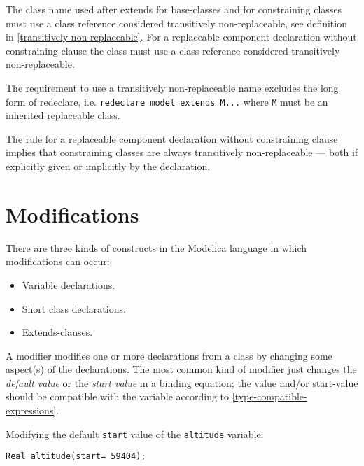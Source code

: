 The class name used after extends for base-classes and for constraining
classes must use a class reference considered transitively
non-replaceable, see definition in \autoref{transitively-non-replaceable}.
For a replaceable component declaration without constraining
clause the class must use a class reference considered transitively
non-replaceable.

\begin{nonnormative}
The requirement to use a transitively non-replaceable name excludes the long form of redeclare, i.e. \lstinline!redeclare model extends M...! where
\lstinline!M! must be an inherited replaceable class.
\end{nonnormative}

\begin{nonnormative}
The rule for a replaceable component declaration without constraining clause implies that constraining classes are always transitively non-replaceable --- both
if explicitly given or implicitly by the declaration.
\end{nonnormative}

\section{Modifications}

There are three kinds of constructs in the Modelica language in which
modifications can occur:
\begin{itemize}
\item
  Variable declarations.
\item
  Short class declarations.
\item
  Extends-clauses.
\end{itemize}

A modifier modifies one or more declarations from a class by changing
some aspect(s) of the declarations. The most common kind of modifier
just changes the \emph{default value} or the \emph{start value} in a
binding equation; the value and/or start-value should be compatible with
the variable according to \autoref{type-compatible-expressions}.

\begin{example}
Modifying the default \lstinline!start! value of the \lstinline!altitude! variable:
\begin{lstlisting}[language=modelica]
Real altitude(start= 59404);
\end{lstlisting}
\end{example}

